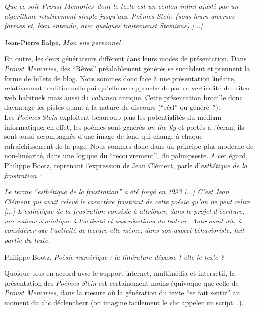 \documentclass{article}
\newenvironment{citationbox}
{\begin{center}
		\begin{minipage}{.8\textwidth}
		}
		{
		\end{minipage}	
\end{center}
}
\begin{document}
				\begin{citationbox}
				\textit{Que ce soit Proust Memories dont le texte est un centon infini ajusté par un algorithme relativement simple jusqu'aux Poèmes Stein (sous leurs diverses formes et, bien entendu, avec quelques traitemenst Steiniens) [...]}
					\begin{flushright}
						Jean-Pierre Balpe, \textit{Mon site personnel} \cite{balpe_blog}
					\end{flushright}
				\end{citationbox}
				
				En outre, les deux générateurs diffèrent dans leurs modes de présentation. Dans \textit{Proust Memories}, des ``Rêves'' préalablement générés se succèdent et prennent la forme de billets de blog. Nous sommes donc face à une présentation linéaire, relativement traditionnelle puisqu'elle se rapproche de par sa verticalité des sites web habituels mais aussi du \textit{volumen} antique. Cette présentation brouille donc davantage les pistes quant à la nature du discours (``réel'' ou généré ?).\\
				Les \textit{Poèmes Stein} exploitent beaucoup plus les potentialités du médium informatique; en effet, les poèmes sont générés \textit{on the fly} et portés à l'écran, ils sont aussi accompagnés d'une image de fond qui change à chaque rafraîchissement de la page. Nous sommes donc dans un principe plus moderne de non-linéarité, dans une logique du ``recouvrement'', du palimpseste. A cet égard, Philippe Bootz, reprenant l'expression de Jean Clément, parle d'\textit{esthétique de la frustration}~:
				\begin{citationbox}
					\textit{Le terme ``esthétique de la frustration'' a été forgé en 1993 [...] C’est Jean Clément qui avait
					relevé le caractère frustrant de cette poésie qu’on ne peut relire [...] L’esthétique de
					la frustration consiste à attribuer, dans le projet d’écriture, une valeur sémiotique à l’activité et
					aux réactions du lecteur. Autrement dit, à considérer que l’activité de lecture elle-même, dans
					son aspect béhavioriste, fait partie du texte.}
					\begin{flushright}
						Philippe Bootz, \textit{Poésie numérique : la littérature dépasse-t-elle le texte ?} \cite{bootz2005}
					\end{flushright} 
				\end{citationbox}
				
				
				Quoique plus en accord avec le support internet, multimédia et interactif, la présentation des \textit{Poèmes Stein} est certainement moins équivoque que celle de \textit{Proust Memories}, dans la mesure où la génération du texte ``se fait sentir'' au moment du clic déclencheur (on imagine facilement le clic appeler un script...).\\
				
\end{document}
